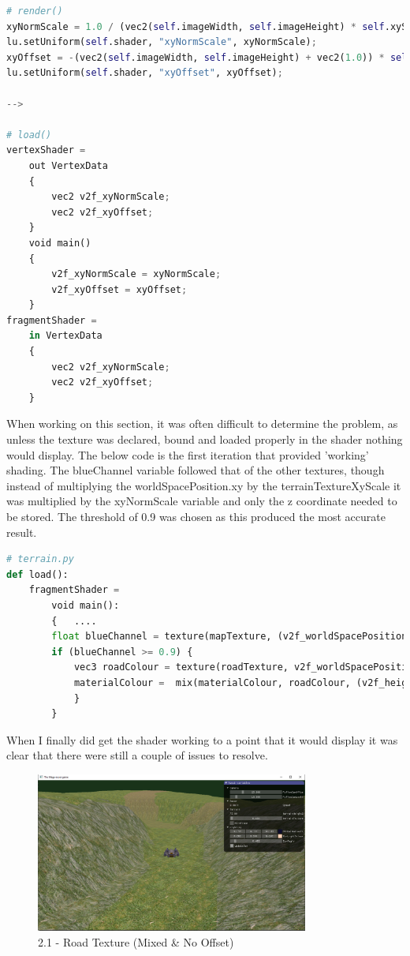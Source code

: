 \documentclass[a4 paper, 12pt]{article}
\begin{document}
\begin{lstlisting}[language=python]
# render()      
xyNormScale = 1.0 / (vec2(self.imageWidth, self.imageHeight) * self.xyScale);
lu.setUniform(self.shader, "xyNormScale", xyNormScale);
xyOffset = -(vec2(self.imageWidth, self.imageHeight) + vec2(1.0)) * self.xyScale / 2.0;
lu.setUniform(self.shader, "xyOffset", xyOffset);

--> 

# load()
vertexShader =
    out VertexData
    {
        vec2 v2f_xyNormScale;
        vec2 v2f_xyOffset;
    }
    void main()
    {
        v2f_xyNormScale = xyNormScale;
        v2f_xyOffset = xyOffset;
    }
fragmentShader = 
    in VertexData
    {
        vec2 v2f_xyNormScale;
        vec2 v2f_xyOffset;
    }
    \end{lstlisting}

When working on this section, it was often difficult to determine the problem, as unless the texture was declared, bound and loaded properly in the shader nothing would display. The below code is the first iteration that provided 'working' shading. The blueChannel variable followed that of the other textures, though instead of multiplying the worldSpacePosition.xy by the terrainTextureXyScale it was multiplied by the xyNormScale variable and only the z coordinate needed to be stored. The threshold of 0.9 was chosen as this produced the most accurate result. 
\begin{lstlisting}[language=python]
# terrain.py       
def load():
    fragmentShader =                 
        void main():
        {   ....
        float blueChannel = texture(mapTexture, (v2f_worldSpacePosition.xy) * v2f_xyNormScale).z;
        if (blueChannel >= 0.9) {
            vec3 roadColour = texture(roadTexture, v2f_worldSpacePosition.xy * terrainTextureXyScale).xyz;
            materialColour =  mix(materialColour, roadColour, (v2f_height/terrainHeightScale));
            }
        }
\end{lstlisting} 

When I finally did get the shader working to a point that it would display it was clear that there were still a couple of issues to resolve.

\begin{figure} [H]
    \centering
    \includegraphics[width=0.8\textwidth, frame]
        {./images/mega_racer/2.1_c_1.PNG}
    \caption{2.1 - Road Texture (Mixed \& No Offset)}   
\end{figure}
\end{document}
